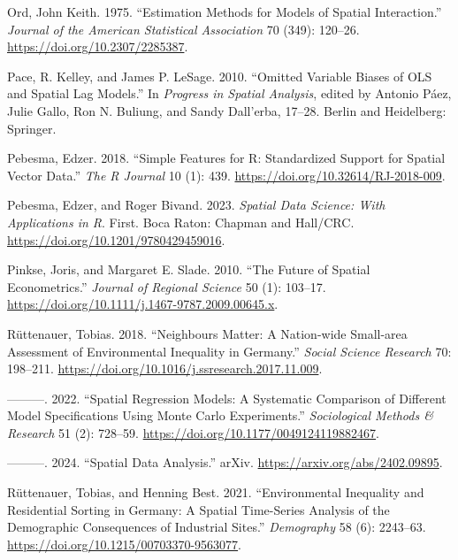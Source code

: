 \documentclass[
  letterpaper,
]{scrbook}
\newlength{\cslhangindent}
\newlength{\cslentryspacingunit} %
\newenvironment{CSLReferences}[2] %
 {%
  \setlength{\parindent}{0pt}
  \ifodd #1
  \let\oldpar\par
  \def\par{\hangindent=\cslhangindent\oldpar}
  \fi
  \setlength{\parskip}{#2\cslentryspacingunit}
 }%
 {}
\begin{document}
\begin{CSLReferences}{1}{0}
\leavevmode{}%
Ord, John Keith. 1975. {``Estimation {Methods} for {Models} of {Spatial
Interaction}.''} \emph{Journal of the American Statistical Association}
70 (349): 120--26. \url{https://doi.org/10.2307/2285387}.

\leavevmode{}%
Pace, R. Kelley, and James P. LeSage. 2010. {``Omitted {Variable Biases}
of {OLS} and {Spatial Lag Models}.''} In \emph{Progress in {Spatial
Analysis}}, edited by Antonio Páez, Julie Gallo, Ron N. Buliung, and
Sandy Dall'erba, 17--28. {Berlin and Heidelberg}: {Springer}.

\leavevmode{}%
Pebesma, Edzer. 2018. {``Simple Features for {R}: {Standardized} Support
for Spatial Vector Data.''} \emph{The R Journal} 10 (1): 439.
\url{https://doi.org/10.32614/RJ-2018-009}.

\leavevmode{}%
Pebesma, Edzer, and Roger Bivand. 2023. \emph{Spatial {Data Science}:
{With Applications} in {R}}. First. {Boca Raton}: {Chapman and
Hall/CRC}. \url{https://doi.org/10.1201/9780429459016}.

\leavevmode{}%
Pinkse, Joris, and Margaret E. Slade. 2010. {``The {Future} of {Spatial
Econometrics}.''} \emph{Journal of Regional Science} 50 (1): 103--17.
\url{https://doi.org/10.1111/j.1467-9787.2009.00645.x}.

\leavevmode{}%
Rüttenauer, Tobias. 2018. {``Neighbours {Matter}: {A Nation-wide
Small-area Assessment} of {Environmental Inequality} in {Germany}.''}
\emph{Social Science Research} 70: 198--211.
\url{https://doi.org/10.1016/j.ssresearch.2017.11.009}.

\leavevmode{}%
---------. 2022. {``Spatial {Regression Models}: {A Systematic
Comparison} of {Different Model Specifications Using Monte Carlo
Experiments}.''} \emph{Sociological Methods \& Research} 51 (2):
728--59. \url{https://doi.org/10.1177/0049124119882467}.

\leavevmode{}%
---------. 2024. {``Spatial {Data Analysis}.''} {arXiv}.
\url{https://arxiv.org/abs/2402.09895}.

\leavevmode{}%
Rüttenauer, Tobias, and Henning Best. 2021. {``Environmental
{Inequality} and {Residential Sorting} in {Germany}: {A Spatial
Time-Series Analysis} of the {Demographic Consequences} of {Industrial
Sites}.''} \emph{Demography} 58 (6): 2243--63.
\url{https://doi.org/10.1215/00703370-9563077}.


\end{CSLReferences}
\end{document}
